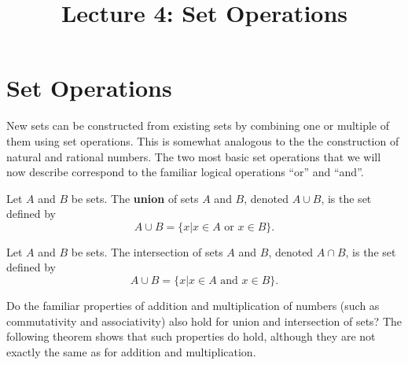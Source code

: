 \documentclass[a4paper,english,12pt]{article}
\begin{document}
\title{Lecture 4: Set Operations}
\author{}
\maketitle

\section{Set Operations}
New sets can be constructed from existing sets by combining one or multiple of them using set operations. This is somewhat analogous to the the construction of natural and rational numbers. The two most basic set operations that we will now describe correspond to the familiar logical operations ``or'' and ``and''. \\

\begin{defn}[Union] Let $A$ and $B$ be sets. The \textbf{union} of sets $A$ and $B$, denoted $A \cup B$, is the set defined by 
\begin{equation*}
 A \cup B = \{ x | x \in A \text{ or } x \in B \}.
\end{equation*}
\end{defn}
\begin{defn}[Intersection] Let $A$ and $B$ be sets. The intersection of sets $A$ and $B$, denoted $A \cap B$, is the set defined by 
\begin{equation*}
 A \cup B = \{ x | x \in A \text{ and } x \in B \}.
\end{equation*}
\end{defn}

Do the familiar properties of addition and multiplication of numbers (such as commutativity and associativity) also hold for union and intersection of sets? The following theorem shows that such properties do hold, although they are not exactly the same as for addition and multiplication.
\end{document}

